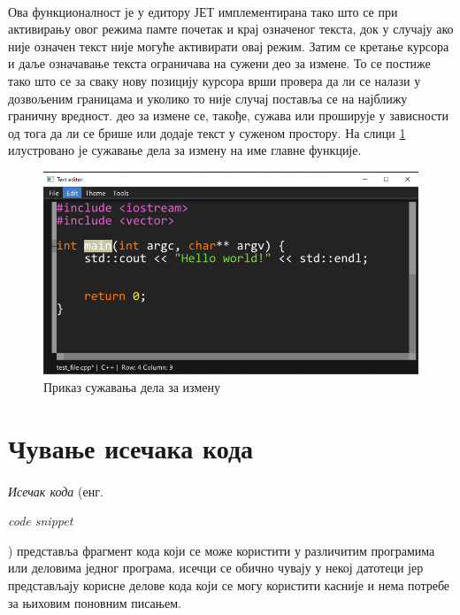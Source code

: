 \documentclass[12pt,oneside]{memoir}
\begin{document}
\paragraph{}
Ова функционалност је у едитору ЈЕТ имплементирана тако што се при
активирању овог режима памте почетак и крај означеног текста, док у случају ако није означен текст није могуће активирати овај режим. Затим се кретање курсора
и даље означавање текста ограничава на сужени део за измене. То се постиже тако што се за сваку нову позицију курсора врши провера да ли се налази у дозвољеним границама и уколико то није случај поставља се на најближу граничну вредност.  део за измене се, такође, сужава или проширује у зависности од тога
да ли се брише или додаје текст у суженом простору. На слици
\ref{fig:edit_narrowing} илустровано је сужавање дела за измену на име главне
функције.

\begin{figure}[!ht]
	\centering
	\includegraphics[width=1.0\textwidth]{images/edit_narrowing.png}
	\caption{Приказ сужавања дела за измену}
	\label{fig:edit_narrowing}
\end{figure}


\section{Чување исечака кода}

\paragraph{}
\emph{Исечак кода} (енг. \begin{latinica}\textit{code snippet}\end{latinica})
представља фрагмент кода који се може користити у различитим програмима или
деловима једног програма, исечци се обично чувају у некој датотеци јер представљају корисне делове кода који се могу користити касније и нема потребе
за њиховим поновним писањем. 
\end{document}
